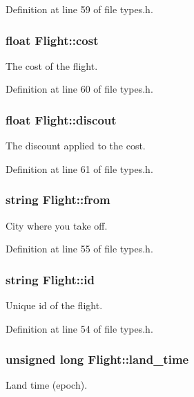 Definition at line 59 of file types.\-h.

\hypertarget{struct_flight_a8906da621927c577acc9e423081c2bfa}{
\subsubsection[{cost}]{\setlength{\rightskip}{0pt plus 5cm}float Flight\-::cost}}\label{struct_flight_a8906da621927c577acc9e423081c2bfa}
The cost of the flight. 

Definition at line 60 of file types.\-h.

\hypertarget{struct_flight_ae1412fea1196cc04d5ec761c135ec5a3}{
\subsubsection[{discout}]{\setlength{\rightskip}{0pt plus 5cm}float Flight\-::discout}}\label{struct_flight_ae1412fea1196cc04d5ec761c135ec5a3}
The discount applied to the cost. 

Definition at line 61 of file types.\-h.

\hypertarget{struct_flight_a2eebc4a79282532468b4668141b09acc}{
\subsubsection[{from}]{\setlength{\rightskip}{0pt plus 5cm}string Flight\-::from}}\label{struct_flight_a2eebc4a79282532468b4668141b09acc}
City where you take off. 

Definition at line 55 of file types.\-h.

\hypertarget{struct_flight_a3bbf0e0f8011e218386b569f98efb0eb}{
\subsubsection[{id}]{\setlength{\rightskip}{0pt plus 5cm}string Flight\-::id}}\label{struct_flight_a3bbf0e0f8011e218386b569f98efb0eb}
Unique id of the flight. 

Definition at line 54 of file types.\-h.

\hypertarget{struct_flight_a8595c2a4dbdb6b5c4f391bd46aae2109}{
\subsubsection[{land\-\_\-time}]{\setlength{\rightskip}{0pt plus 5cm}unsigned long Flight\-::land\-\_\-time}}\label{struct_flight_a8595c2a4dbdb6b5c4f391bd46aae2109}
Land time (epoch). 

